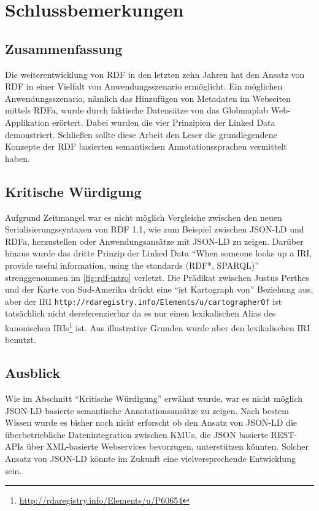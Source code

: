 \section{Schlussbemerkungen}
\subsection{Zusammenfassung}

Die weiterentwicklung von RDF in den letzten zehn Jahren hat den Ansatz von RDF in einer Vielfalt von Anwendungsszenario  ermöglicht. Ein möglichen Anwendungsszenario, nämlich das Hinzufügen von Metadaten im Webseiten mittels RDFa, wurde durch faktische Datensätze von das Globmaplab Web-Applikation erörtert. Dabei wurden die vier Prinzipien der Linked Data demonstriert. Schließen sollte diese Arbeit den Leser die grundlegendene Konzepte der RDF basierten semantischen Annotationssprachen vermittelt haben.

\subsection{Kritische Würdigung}
Aufgrund Zeitmangel war es nicht möglich Vergleiche zwischen den neuen Serialisierungssyntaxen von RDF 1.1, wie zum Beispiel zwischen JSON-LD und RDFa, herzustellen oder Anwendungsansätze mit JSON-LD zu zeigen. Darüber hinaus wurde das dritte Prinzip der Linked Data \hyphenquote{german}{When someone looks up a IRI, provide useful information, using the standards (RDF*, SPARQL)} strenggenommen im \autoref{fig:rdf-intro} verletzt. Die Prädikat zwischen Justus Perthes und der Karte von Sud-Amerika drückt eine \hyphenquote{german}{ist Kartograph von} Beziehung aus, aber der IRI \texttt{http://rdaregistry.info/Elements/u/cartographerOf} ist tatsächlich nicht dereferenzierbar da es nur einen lexikalischen Alias des kanonischen IRIs\footnote{\url{http://rdaregistry.info/Elements/u/P60654}} ist. Aus illustrative Grunden wurde aber den lexikalischen IRI benutzt. 

\subsection{Ausblick}
Wie im Abschnitt \hyphenquote{german}{Kritische Würdigung} erwähnt wurde, war es nicht möglich JSON-LD basierte semantische Annotationsansätze zu zeigen. Nach bestem Wissen wurde es bisher noch nicht erforscht ob den Ansatz von JSON-LD die überbetriebliche Datenintegration zwischen KMUs, die JSON basierte REST-APIs über XML-basierte Webservices bevorzugen, unterstützen könnten\footnotemark{}. Solcher Ansatz von JSON-LD könnte im Zukunft eine vielversprechende Entwicklung sein.
